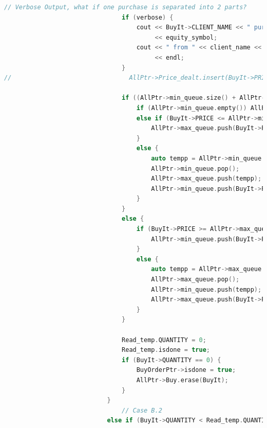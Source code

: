 \documentclass{article}
\begin{document}
\begin{lstlisting}[language=C++]
                                // Verbose Output, what if one purchase is separated into 2 parts?
                                if (verbose) {
                                    cout << BuyIt->CLIENT_NAME << " purchased " << quantity << " shares of "
                                         << equity_symbol;
                                    cout << " from " << client_name << " for $" << BuyIt->PRICE << "/share"
                                         << endl;
                                }
//                                AllPtr->Price_dealt.insert(BuyIt->PRICE);

                                if ((AllPtr->min_queue.size() + AllPtr->max_queue.size()) % 2 == 0) {
                                    if (AllPtr->min_queue.empty()) AllPtr->max_queue.push(BuyIt->PRICE);
                                    else if (BuyIt->PRICE <= AllPtr->min_queue.top()) {
                                        AllPtr->max_queue.push(BuyIt->PRICE);
                                    }
                                    else {
                                        auto tempp = AllPtr->min_queue.top();
                                        AllPtr->min_queue.pop();
                                        AllPtr->max_queue.push(tempp);
                                        AllPtr->min_queue.push(BuyIt->PRICE);
                                    }
                                }
                                else {
                                    if (BuyIt->PRICE >= AllPtr->max_queue.top()) {
                                        AllPtr->min_queue.push(BuyIt->PRICE);
                                    }
                                    else {
                                        auto tempp = AllPtr->max_queue.top();
                                        AllPtr->max_queue.pop();
                                        AllPtr->min_queue.push(tempp);
                                        AllPtr->max_queue.push(BuyIt->PRICE);
                                    }
                                }

                                Read_temp.QUANTITY = 0;
                                Read_temp.isdone = true;
                                if (BuyIt->QUANTITY == 0) {
                                    BuyOrderPtr->isdone = true;
                                    AllPtr->Buy.erase(BuyIt);
                                }
                            }
                                // Case B.2
                            else if (BuyIt->QUANTITY < Read_temp.QUANTITY && Read_temp.PRICE <= BuyIt->PRICE) {


\end{lstlisting}
\end{document}
